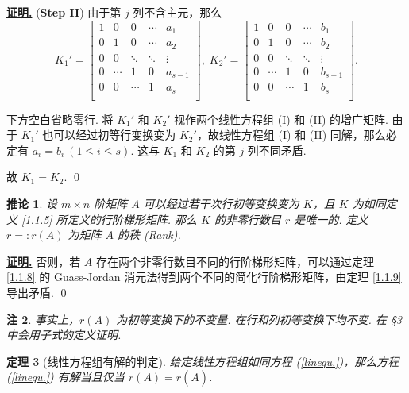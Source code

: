 \documentclass[10pt,openany]{article}
\theoremstyle{thmstyle} %
\newtheorem{theorem}{定理}[subsection]
\theoremstyle{defstyle} %
\newtheorem{corollary}[theorem]{推论}
\theoremstyle{prostyle} %
\theoremstyle{exastyle}
\theoremstyle{remstyle}
\newtheorem{remark}[theorem]{注}
\renewenvironment{proof}[1][证明]{\par\underline{\textbf{#1.}} \;\fangsong}{\qed\par}
\begin{document}
\begin{proof}
	(\textbf{Step II}) 由于第 \( j \) 列不含主元，那么
	\[ K_1'= \begin{bmatrix}
		1 & 0 & 0  & \cdots & a_1 \\
		0 & 1 & 0   & \cdots & a_2 \\
		0 & 0 & \ddots & \ddots & \vdots  \\
		0 &  \cdots & 1  & 0 & a_{s-1} \\
		0 & 0  & \cdots & 1 & a_s \\
		&  &  &  &   
	\end{bmatrix}, \; K_2'=\begin{bmatrix}
		1 & 0 & 0  & \cdots & b_1 \\
		0 & 1 & 0   & \cdots & b_2 \\
		0 & 0 & \ddots & \ddots & \vdots  \\
		0 &  \cdots & 1  & 0 & b_{s-1} \\
		0 & 0  & \cdots & 1 & b_s \\
		&  &  &  &   
	\end{bmatrix}. \]
	
	下方空白省略零行. 将 \( K_1' \) 和 \( K_2' \) 视作两个线性方程组 (I) 和 (II) 的增广矩阵. 由于 \( K_1' \) 也可以经过初等行变换变为 \( K_2' \)，故线性方程组 (I) 和 (II) 同解，那么必定有 \( a_i=b_i \ (1 \leq i \leq s) \). 这与 \( K_1 \) 和 \( K_2 \) 的第 \( j \) 列不同矛盾.
	
	故 \( K_1=K_2 \).
\end{proof}

\begin{corollary}
	设 \( m \times n \) 阶矩阵 \( A \) 可以经过若干次行初等变换变为 \( K \)，且 \( K \) 为如同定义 \ref{1.1.5} 所定义的行阶梯形矩阵. 那么 \( K \) 的非零行数目 \( r \) 是唯一的. 定义 \( r=:r(A) \) 为矩阵 \( A \) 的秩 (Rank). 
\end{corollary}

\begin{proof}
	否则，若 \( A \) 存在两个非零行数目不同的行阶梯形矩阵，可以通过定理 \ref{1.1.8} 的 Guass-Jordan 消元法得到两个不同的简化行阶梯形矩阵，由定理 \ref{1.1.9} 导出矛盾.
\end{proof}

\begin{remark}
	事实上，\( r(A) \) 为初等变换下的不变量. 在行和列初等变换下均不变. 在 \S 3 中会用子式的定义证明.
\end{remark}

\begin{theorem}[线性方程组有解的判定]	\label{1.1.12}
	给定线性方程组如同方程 (\ref{linequ.})，那么方程 (\ref{linequ.}) 有解当且仅当 \( r(A)=r(\overline{A}) \).

\end{theorem}
\end{document}
